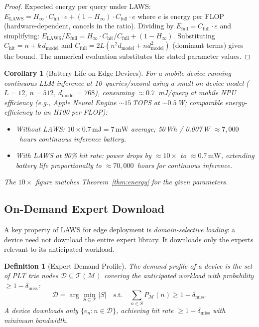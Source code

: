 \documentclass[11pt]{article}
\newtheorem{definition}{Definition}
\newtheorem{corollary}{Corollary}
\begin{document}
\begin{proof}
Expected energy per query under LAWS:
$E_{\mathrm{LAWS}} = H_\infty \cdot C_{\mathrm{hit}} \cdot e +
(1 - H_\infty) \cdot C_{\mathrm{full}} \cdot e$
where $e$ is energy per FLOP (hardware-dependent, cancels in the ratio).
Dividing by $E_{\mathrm{full}} = C_{\mathrm{full}} \cdot e$ and simplifying:
$E_{\mathrm{LAWS}}/E_{\mathrm{full}} = H_\infty \cdot C_{\mathrm{hit}}/C_{\mathrm{full}}
+ (1 - H_\infty)$.  Substituting $C_{\mathrm{hit}} = n + k\,d_{\mathrm{model}}$ and
$C_{\mathrm{full}} = 2L(n^2 d_{\mathrm{model}} + nd_{\mathrm{model}}^2)$ (dominant terms) gives the bound.
The numerical evaluation substitutes the stated parameter values.
\end{proof}

\begin{corollary}[Battery Life on Edge Devices]
For a mobile device running continuous LLM inference at 10~queries/second
using a small on-device model ($L=12$, $n=512$, $d_{\mathrm{model}}=768$), consuming
$\approx 0.7$~mJ/query at mobile NPU efficiency (e.g., Apple Neural Engine ${\sim}15$\,TOPS at ${\sim}0.5$\,W; comparable energy-efficiency to
an H100 per FLOP):
\begin{itemize}[leftmargin=2em]
  \item Without LAWS: $10 \times 0.7\,\text{mJ} = 7\,\text{mW}$ average;
        50\,Wh / 0.007\,W $\approx 7{,}000$~hours continuous inference battery.
  \item With LAWS at 90\% hit rate: power drops by $\approx 10\times$ to
        $\approx 0.7\,\text{mW}$, extending battery life proportionally to
        $\approx 70{,}000$~hours for continuous inference.
\end{itemize}
The $10\times$ figure matches Theorem~\ref{thm:energy} for the given parameters.
\end{corollary}

\subsection{On-Demand Expert Download}

A key property of LAWS for edge deployment is \emph{domain-selective loading}:
a device need not download the entire expert library.  It downloads only the
experts relevant to its anticipated workload.

\begin{definition}[Expert Demand Profile]
The \emph{demand profile} of a device is the set of PLT trie nodes
$\mathcal{D} \subseteq \mathcal{T}(\mathcal{M})$ covering the anticipated
workload with probability $\geq 1 - \delta_{\mathrm{miss}}$:
\[
  \mathcal{D} = \arg\min_{S \subseteq \mathcal{T}} |S|
  \quad \text{s.t.} \quad \sum_{n \in S} P_{\mathcal{M}}(n) \geq 1 - \delta_{\mathrm{miss}}.
\]
A device downloads only $\{e_n : n \in \mathcal{D}\}$, achieving hit rate
$\geq 1 - \delta_{\mathrm{miss}}$ with minimum bandwidth.
\end{definition}
\end{document}
